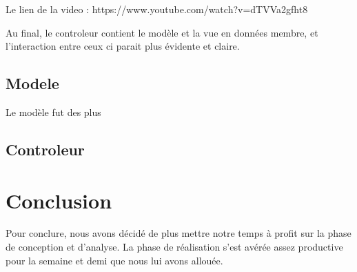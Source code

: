 \documentclass[a4paper,10pt]{article}
\begin{document}
Le lien de la video : https://www.youtube.com/watch?v=dTVVa2gfht8

Au final, le controleur contient le modèle et la vue en données membre, et l'interaction entre ceux ci parait plus évidente et claire.

\subsection{Modele}
Le modèle fut des plus 

\subsection{Controleur}


\section{Conclusion}
Pour conclure, nous avons décidé de plus mettre notre temps à profit sur la phase de conception et d'analyse. La phase de réalisation s'est avérée assez productive pour la semaine et demi que nous lui avons allouée. 
\end{document}
